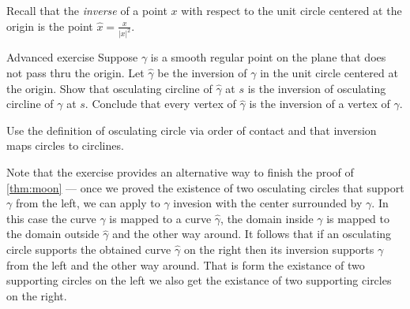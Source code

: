 Recall that the \emph{inverse} of a point $x$ with respect to the unit circle centered at the origin is the point $\hat x=\tfrac{x}{|x|^2}$.



\begin{thm}{Advanced exercise}
Suppose $\gamma$ is a smooth regular point on the plane that does not pass thru the origin.
Let $\hat \gamma$ be the inversion of $\gamma$ in the unit circle centered at the origin.
Show that osculating circline of $\hat\gamma$ at $s$ is the inversion of osculating circline of $\gamma$ at $s$.
Conclude that every vertex of $\hat\gamma$ is the inversion of a vertex of $\gamma$.
\end{thm}

 Use the definition of osculating circle via order of contact and that inversion maps circles to circlines. 


Note that the exercise provides an alternative way to finish the proof of \ref{thm:moon} --- once we proved the existence of two osculating circles that support $\gamma$ from the left,
we can apply to $\gamma$ invesion with the center surrounded by $\gamma$.
In this case the curve $\gamma$ is mapped to a curve $\hat \gamma$,
the domain inside $\gamma$ is mapped to the domain outside $\hat\gamma$ and the other way around.
It follows that if an osculating circle supports the obtained curve $\hat\gamma$ on the right 
then its inversion supports  $\gamma$ from the left and the other way around.
That is form the existance of two supporting circles on the left we also get the existance of two supporting circles on the right.


